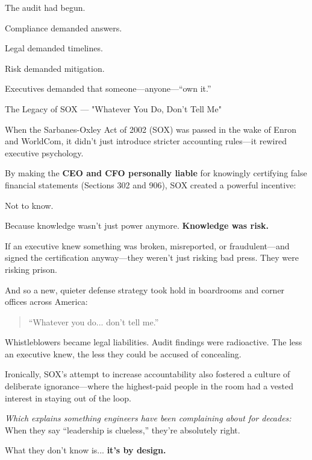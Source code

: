     The audit had begun.
    
    Compliance demanded answers.
    
    Legal demanded timelines.
    
    Risk demanded mitigation.
    
    Executives demanded that someone—anyone—“own it.”

    \medskip

\begin{HistoricalSidebar}{The Legacy of SOX --- "Whatever You Do, Don't Tell Me"}

    When the Sarbanes-Oxley Act of 2002 (SOX) was passed in the wake of Enron and WorldCom, it didn’t just introduce stricter accounting rules—it rewired executive psychology.

    \medskip
    
    By making the \textbf{CEO and CFO personally liable} for knowingly certifying false financial statements (Sections 302 and 906), SOX created a powerful incentive:

    \medskip
    
    Not to know.

    \medskip
    
    Because knowledge wasn’t just power anymore.  
    \textbf{Knowledge was risk.}

    \medskip
    
    If an executive knew something was broken, misreported, or fraudulent—and signed the certification anyway—they weren’t just risking bad press.  
    They were risking prison.

    \medskip
    
    And so a new, quieter defense strategy took hold in boardrooms and corner offices across America:
    
    \begin{quote}
    “Whatever you do... don’t tell me.”
    \end{quote}
    
    Whistleblowers became legal liabilities.  
    Audit findings were radioactive.  
    The less an executive knew, the less they could be accused of concealing.

    \medskip
    
    Ironically, SOX’s attempt to increase accountability also fostered a culture of deliberate ignorance—where the highest-paid people in the room had a vested interest in staying out of the loop.
    
    \medskip
    
    \textit{Which explains something engineers have been complaining about for decades:} 
    When they say “leadership is clueless,” they’re absolutely right.

    \medskip
    
    What they don’t know is...  \textbf{it’s by design.}
    
\end{HistoricalSidebar}

